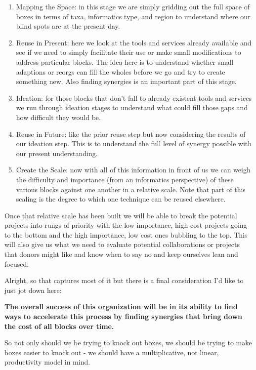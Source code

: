 \documentclass[10pt,a5paper]{book}
\begin{document}
\begin{enumerate}
\item {Mapping the Space}: in this stage we are simply gridding out the full space of boxes in terms of taxa, informatics type, and region to understand where our blind spots are at the present day.
\item {Reuse in Present}: here we look at the tools and services already available and see if we need to simply facilitate their use or make small modifications to address particular blocks. The idea here is to understand whether small adaptions or reorgs can fill the wholes before we go and try to create something new. Also finding synergies is an important part of this stage.
\item {Ideation}: for those blocks that don't fall to already existent tools and services we run through ideation stages to understand what could fill those gaps and how difficult they would be. 
\item {Reuse in Future}: like the prior reuse step but now considering the results of our ideation step. This is to understand the full level of synergy possible with our present understanding.
\item {Create the Scale}: now with all of this information in front of us we can weigh the difficulty and importance (from an informatics perspective) of these various blocks against one another in a relative scale. Note that part of this scaling is the degree to which one technique can be reused elsewhere. 
\end{enumerate}

Once that relative scale has been built we will be able to break the potential projects into rungs of priority with the low importance, high cost projects going to the bottom and the high importance, low cost ones bubbling to the top. This will also give us what we need to evaluate potential collaborations or projects that donors might like and know when to say no and keep ourselves lean and focused. 

Alright, so that captures most of it but there is a final consideration I'd like to just jot down here: \linebreak

\textbf{The overall success of this organization will be in its ability to find ways to accelerate this process by finding synergies that bring down the cost of all blocks over time.} \linebreak

So not only should we be trying to knock out boxes, we should be trying to make boxes easier to knock out - we should have a multiplicative, not linear, productivity model in mind. 
\end{document}
